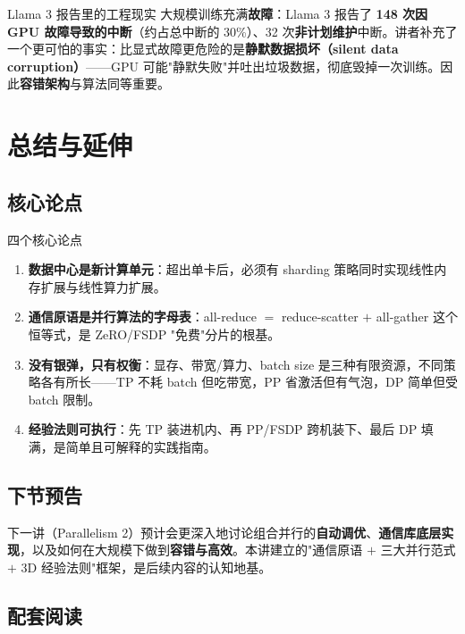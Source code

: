 \documentclass[a4paper]{article}
\begin{document}
\begin{practicebox}{Llama 3 报告里的工程现实}
大规模训练充满\textbf{故障}：Llama 3 报告了 \textbf{148 次因 GPU 故障导致的中断}（约占总中断的 30\%）、32 次\textbf{非计划维护}中断。讲者补充了一个更可怕的事实：比显式故障更危险的是\textbf{静默数据损坏（silent data corruption）}——GPU 可能"静默失败"并吐出垃圾数据，彻底毁掉一次训练。因此\textbf{容错架构}与算法同等重要。
\end{practicebox}

\section{总结与延伸}

\subsection{核心论点}

\begin{importantbox}{四个核心论点}
\begin{enumerate}
\item \textbf{数据中心是新计算单元}：超出单卡后，必须有 sharding 策略同时实现线性内存扩展与线性算力扩展。
\item \textbf{通信原语是并行算法的字母表}：all-reduce $=$ reduce-scatter $+$ all-gather 这个恒等式，是 ZeRO/FSDP "免费"分片的根基。
\item \textbf{没有银弹，只有权衡}：显存、带宽/算力、batch size 是三种有限资源，不同策略各有所长——TP 不耗 batch 但吃带宽，PP 省激活但有气泡，DP 简单但受 batch 限制。
\item \textbf{经验法则可执行}：先 TP 装进机内、再 PP/FSDP 跨机装下、最后 DP 填满，是简单且可解释的实践指南。
\end{enumerate}
\end{importantbox}

\subsection{下节预告}

下一讲（Parallelism 2）预计会更深入地讨论组合并行的\textbf{自动调优}、\textbf{通信库底层实现}，以及如何在大规模下做到\textbf{容错与高效}。本讲建立的"通信原语 $+$ 三大并行范式 $+$ 3D 经验法则"框架，是后续内容的认知地基。

\subsection{配套阅读}
\end{document}

